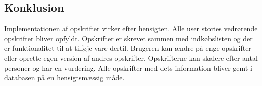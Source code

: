 \subsection{Konklusion}
Implementationen af opskrifter virker efter hensigten. 
Alle user stories vedrørende opskrifter bliver opfyldt. 
Opskrifter er skrevet sammen med indkøbslisten og der er funktionalitet til at tilføje vare dertil. Brugeren kan ændre på enge opskrifter eller oprette egen version af andres opskrifter. 
Opskrifterne kan skalere efter antal personer og har en vurdering. 
Alle opskrifter med dets information bliver gemt i databasen på en hensigtsmæssig måde.
